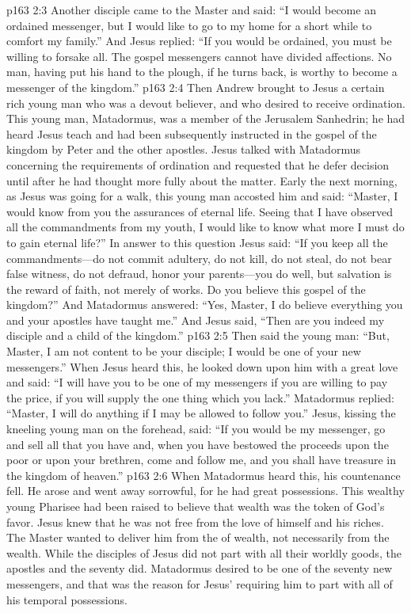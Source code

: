 \vs p163 2:3 Another disciple came to the Master and said: “I would become an ordained messenger, but I would like to go to my home for a short while to comfort my family.” And Jesus replied: \textcolor{ubdarkred}{“If you would be ordained, you must be willing to forsake all. The gospel messengers cannot have divided affections. No man, having put his hand to the plough, if he turns back, is worthy to become a messenger of the kingdom.”}
\pc \vs p163 2:4 Then Andrew brought to Jesus a certain rich young man who was a devout believer, and who desired to receive ordination. This young man, Matadormus, was a member of the Jerusalem Sanhedrin; he had heard Jesus teach and had been subsequently instructed in the gospel of the kingdom by Peter and the other apostles. Jesus talked with Matadormus concerning the requirements of ordination and requested that he defer decision until after he had thought more fully about the matter. Early the next morning, as Jesus was going for a walk, this young man accosted him and said: “Master, I would know from you the assurances of eternal life. Seeing that I have observed all the commandments from my youth, I would like to know what more I must do to gain eternal life?” In answer to this question Jesus said: \textcolor{ubdarkred}{“If you keep all the commandments---do not commit adultery, do not kill, do not steal, do not bear false witness, do not defraud, honor your parents---you do well, but salvation is the reward of faith, not merely of works. Do you believe this gospel of the kingdom?”} And Matadormus answered: “Yes, Master, I do believe everything you and your apostles have taught me.” And Jesus said, \textcolor{ubdarkred}{“Then are you indeed my disciple and a child of the kingdom.”}
\vs p163 2:5 Then said the young man: “But, Master, I am not content to be your disciple; I would be one of your new messengers.” When Jesus heard this, he looked down upon him with a great love and said: \textcolor{ubdarkred}{“I will have you to be one of my messengers if you are willing to pay the price, if you will supply the one thing which you lack.”} Matadormus replied: “Master, I will do anything if I may be allowed to follow you.” Jesus, kissing the kneeling young man on the forehead, said: \textcolor{ubdarkred}{“If you would be my messenger, go and sell all that you have and, when you have bestowed the proceeds upon the poor or upon your brethren, come and follow me, and you shall have treasure in the kingdom of heaven.”}
\vs p163 2:6 When Matadormus heard this, his countenance fell. He arose and went away sorrowful, for he had great possessions. This wealthy young Pharisee had been raised to believe that wealth was the token of God’s favor. Jesus knew that he was not free from the love of himself and his riches. The Master wanted to deliver him from the  of wealth, not necessarily from the wealth. While the disciples of Jesus did not part with all their worldly goods, the apostles and the seventy did. Matadormus desired to be one of the seventy new messengers, and that was the reason for Jesus’ requiring him to part with all of his temporal possessions.
